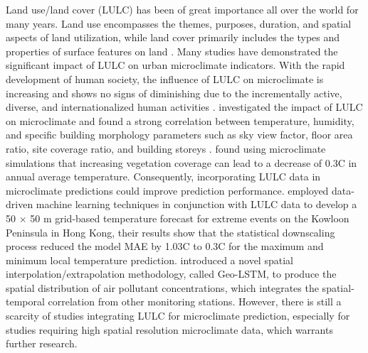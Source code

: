 \documentclass[a4paper,fleqn]{cas-sc}
\begin{document}
Land use/land cover (LULC) has been of great importance all over the world for many years. Land use encompasses the themes, purposes, duration, and spatial aspects of land utilization, while land cover primarily includes the types and properties of surface features on land \citep{nedd2021synthesis}. Many studies have demonstrated the significant impact of LULC on urban microclimate indicators. With the rapid development of human society, the influence of LULC on microclimate is increasing and shows no signs of diminishing due to the incrementally active, diverse, and internationalized human activities \citep{caballero2022land, naikoo2022land,abdullah2022investigating}. \cite{zhang2022impact} investigated the impact of LULC on microclimate and found a strong correlation between temperature, humidity, and specific building morphology parameters such as sky view factor, floor area ratio, site coverage ratio, and building storeys \citep{wei2016impact}. \cite{erell2022effect} found using microclimate simulations that increasing vegetation coverage can lead to a decrease of 0.3\textdegree C in annual average temperature. Consequently, incorporating LULC data in microclimate predictions could improve prediction performance. \cite{chang2021development} employed data-driven machine learning techniques in conjunction with LULC data to develop a 50 $\times$ 50 m grid-based temperature forecast for extreme events on the Kowloon Peninsula in Hong Kong, their results show that the statistical downscaling process reduced the model MAE by 1.03\textdegree C to 0.3\textdegree C for the maximum and minimum local temperature prediction. \cite{ma2019temporal} introduced a novel spatial interpolation/extrapolation methodology, called Geo-LSTM, to produce the spatial distribution of air pollutant concentrations, which integrates the spatial-temporal correlation from other monitoring stations.  However, there is still a scarcity of studies integrating LULC for microclimate prediction, especially for studies requiring high spatial resolution microclimate data, which warrants further research.

\end{document}
